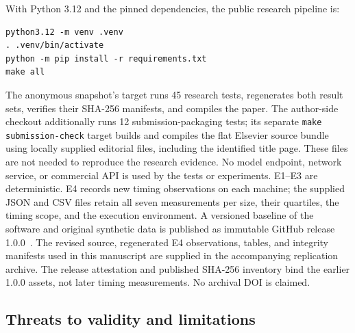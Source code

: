 \documentclass[a4paper,fleqn]{cas-sc}
\begin{document}
With Python 3.12 and the pinned dependencies, the public research pipeline is:
\begin{verbatim}
python3.12 -m venv .venv
. .venv/bin/activate
python -m pip install -r requirements.txt
make all
\end{verbatim}
The anonymous snapshot's target runs 45 research tests, regenerates both
result sets, verifies their SHA-256 manifests, and compiles the paper.
The author-side checkout additionally runs 12 submission-packaging tests;
its separate \texttt{make submission-check} target builds and compiles the
flat Elsevier source bundle using locally supplied editorial files, including
the identified title page. These files are not needed to reproduce the research evidence. No model
endpoint, network service, or commercial API is used by the tests or
experiments. E1--E3 are deterministic. E4 records new timing
observations on each machine; the supplied JSON and CSV files retain all seven
measurements per size, their quartiles, the timing scope, and the execution
environment.
A versioned baseline of the software and original synthetic data is published
as immutable GitHub release 1.0.0~\cite{artifact2026,artifactdata2026}. The
revised source, regenerated E4 observations, tables, and integrity manifests
used in this manuscript are supplied in the accompanying replication archive.
The release attestation and published SHA-256 inventory bind the earlier 1.0.0
assets, not later timing measurements. No archival DOI is claimed.

\subsection{Threats to validity and limitations}
\end{document}
